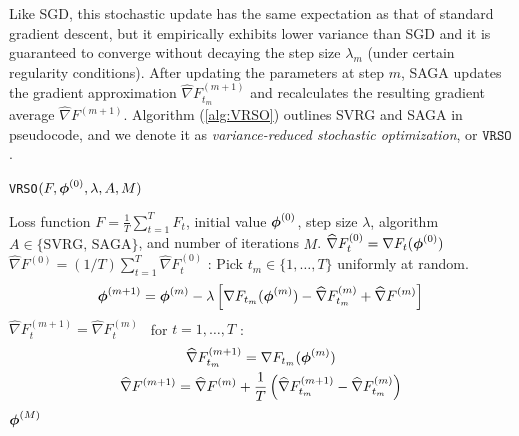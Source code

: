 %
Like SGD, this stochastic update has the same expectation as that of standard gradient descent, but it empirically exhibits lower variance than SGD and it is guaranteed to converge without decaying the step size $\lambda_m$ (under certain regularity conditions). After updating the parameters at step $m$, SAGA updates the gradient approximation $\widehat \nabla F_{t_m}^{(m+1)}$ and recalculates the resulting gradient average $\widehat \nabla F^{(m+1)}$.
%
%
%
%
Algorithm (\ref{alg:VRSO}) outlines SVRG and SAGA in pseudocode, and we denote it as \textit{variance-reduced stochastic optimization}, or $\texttt{VRSO}$. 

\begin{algorithm}
\caption{\texttt{VRSO}$(F,\boldsymbol{\phi}^{(0)},\lambda,A,M)$}\label{alg:VRSO}
\begin{algorithmic}[1]
\Require Loss function $F = \frac{1}{T}\sum_{t=1}^T F_t$, initial value $\boldsymbol{\phi}^{(0)}$, step size $\lambda$, algorithm $A \in \{\text{SVRG, SAGA}\}$, and number of iterations $M$.
%
\vspace{5pt}
 
\State $\widehat \nabla F_{t}^{(0)} = \nabla F_t (\boldsymbol{\phi}^{(0)})$
\EndFor
\State $\widehat \nabla F^{(0)} = (1/T) \sum_{t=1}^T \widehat \nabla F_{t}^{(0)}$
%
:
    \State Pick $t_m \in \{1,\ldots,T\}$ uniformly at random.
    \State {}
    \begin{gather}
        \boldsymbol{\phi}^{(m+1)} = \boldsymbol{\phi}^{(m)} - \lambda \left[\nabla F_{t_m}(\boldsymbol{\phi}^{(m)}) - \widehat \nabla F_{t_m}^{(m)} + \widehat \nabla F^{(m)} \right]
        \label{eqn:SAGA_update0}
    \end{gather}
    \State $\widehat \nabla F_{t}^{(m+1)} = \widehat \nabla F_{t}^{(m)} \enspace$ for $t = 1,\ldots,T$ 
    :
        \begin{gather}
            \widehat \nabla F_{t_m}^{(m+1)} = \nabla F_{t_m}(\boldsymbol{\phi}^{(m)}) \\
            \widehat \nabla F^{(m+1)} = \widehat \nabla F^{(m)} + \frac{1}{T} \left(\widehat \nabla F_{t_m}^{(m+1)} - \widehat \nabla F_{t_m}^{(m)}\right)
        \end{gather}
    \EndIf
\EndFor
\State \Return $\boldsymbol{\phi}^{(M)}$
\end{algorithmic}
\end{algorithm}

